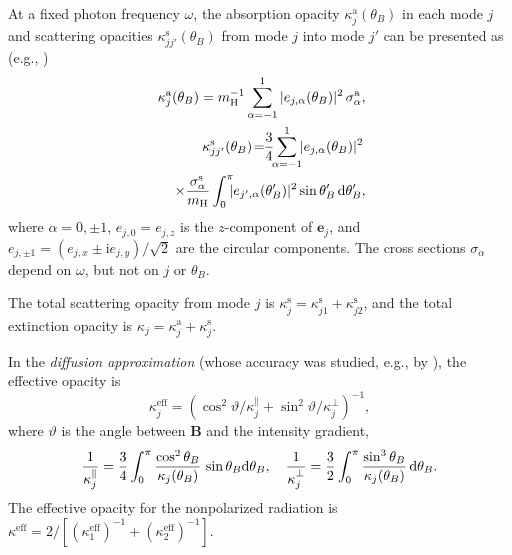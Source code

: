 \documentclass{emulateapj}
\newcommand{\beq}{\begin{equation}}
\newcommand{\eeq}{\end{equation}}
\newcommand{\bea}{\begin{eqnarray}}
\newcommand{\eea}{\end{eqnarray}}
\newcommand{\mH}{m_\mathrm{H}}
\begin{document}
At a fixed photon frequency $\omega$,
the absorption opacity $\kappa_j^\mathrm{a}(\theta_B)$ 
in each mode $j$ and scattering opacities
$\kappa_{jj'}^\mathrm{s}(\theta_B)$ 
from mode $j$ into mode $j'$ can be
presented as (e.g., \citealp{Kam82})
\bea
&&\hspace*{-.7em}
   \kappa_j^\mathrm{a}(\theta_B) = \mH^{-1} \sum_{\alpha=-1}^1
     |e_{j,\alpha}(\theta_B)|^2 \,\sigma_\alpha^\mathrm{a},
\\&&\hspace*{-.7em}
 \kappa_{jj'}^\mathrm{s}(\theta_B) \!=\!\!
     {\frac34}
\!\!
  \sum_{\alpha=-1}^1 \!\!
     |e_{j,\alpha}(\theta_B)|^2 \,
  \nonumber\\&&\times
     {\sigma_\alpha^\mathrm{s}\over \mH}\int_0^\pi \!\!\!
       |e_{j',\alpha}(\theta_B')|^2\sin\theta_B'\,\mathrm{d}\theta_B',
\eea
where $\alpha=0,\pm1$,
 $e_{j,0}=e_{j,z}$ is the $z$-component of $\bm{e}_j$, and
$e_{j,\pm1}=(e_{j,x}\pm \mathrm{i} e_{j,y})/\sqrt{2}$
are the circular components.
The cross sections $\sigma_\alpha$ depend on 
$\omega$, but not on $j$ or $\theta_B$. 

The total scattering opacity from mode $j$ is
$\kappa_j^\mathrm{s}=\kappa_{j1}^\mathrm{s}+\kappa_{j2}^\mathrm{s}$,
and the total extinction opacity is
$\kappa_j=\kappa_j^\mathrm{a}+\kappa_j^\mathrm{s}$.

In the \emph{diffusion approximation} (whose accuracy was studied, e.g.,
by \citealp{SZ95}), the effective opacity
is 
%
\beq
   \kappa_j^{\mathrm{eff}}=
(\cos^2\vartheta/\kappa_j^\| + \sin^2\vartheta/\kappa_j^\perp)^{-1},
\eeq
% 
where $\vartheta$ is the angle between $\bm{B}$ 
and the intensity gradient, 
\beq
 \frac {1}{\kappa_j^\|} = \frac34 \int_0^\pi
    {\cos^2\theta_B\over\kappa_j(\theta_B)}\,
    \sin\theta_B\mathrm{d}\theta_B,
\quad
  \frac{1}{\kappa_j^{\perp\vphantom{\|}}} = \frac32 \int_0^\pi
    {\sin^3\theta_B\over\kappa_j(\theta_B)}\,
    \mathrm{d}\theta_B.
\label{kappa-eff}
\eeq
The effective opacity for the nonpolarized radiation is
$\kappa^{\mathrm{eff}}=2/[(\kappa_1^{\mathrm{eff}})^{-1}+
(\kappa_2^{\mathrm{eff}})^{-1}]$.
\end{document}
